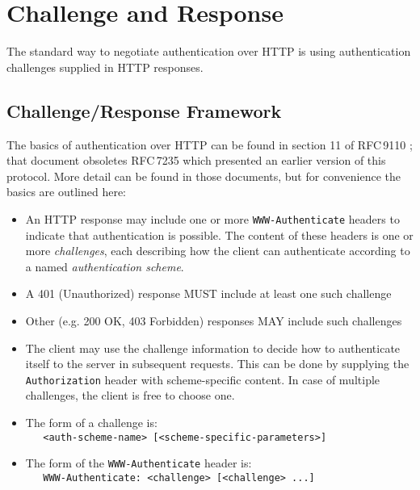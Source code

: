 \documentclass[11pt,a4paper]{ivoa}
\newcommand{\rfc}[1]{RFC\,#1}
\newcommand{\header}[1]{{\tt #1}}
\begin{document}
\section{Challenge and Response}

The standard way to negotiate authentication over HTTP is using
authentication challenges supplied in HTTP responses.

\subsection{Challenge/Response Framework}
\label{sec:challenge-response}

The basics of authentication over HTTP can be found in
section 11 of \rfc{9110} \citep{std:RFC9110};
that document obsoletes \rfc{7235} \citep{std:RFC7235}
which presented an earlier version of this protocol.
More detail can be found in those documents, but for convenience
the basics are outlined here:
\begin{itemize}
  \item An HTTP response may include one or more
        \header{WWW-Authenticate} headers
        to indicate that authentication is possible.
        The content of these headers is one or more {\em challenges},
        each describing how the client can authenticate according
        to a named {\em authentication scheme}.
  \item A 401 (Unauthorized) response MUST include at least one such challenge
  \item Other (e.g. 200 OK, 403 Forbidden) responses
        MAY include such challenges
  \item The client may use the challenge information to decide how
        to authenticate itself to the server in subsequent requests.
        This can be done by supplying the \header{Authorization} header
        with scheme-specific content.
        In case of multiple challenges, the client is free to choose one.
  \item The form of a challenge is:\\
        \verb|   <auth-scheme-name> [<scheme-specific-parameters>]|
  \item The form of the \header{WWW-Authenticate} header is:\\
        \verb|   WWW-Authenticate: <challenge> [<challenge> ...]|
\end{itemize}

\end{document}
